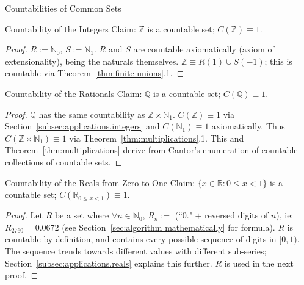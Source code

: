 \documentclass[12pt]{article}
\begin{document}
\begin{section}{Countabilities of Common Sets}\label{sec:applications}
	\begin{subsection}{Countability of the Integers}\label{subsec:applications.integers}
		Claim: $\mathbb Z$ is a countable set; $C(\mathbb Z)\equiv1$.
		\begin{proof}
			$R:=\mathbb N_0$, $S:=\mathbb N_1$. $R$ and $S$ are countable axiomatically
			(axiom of extensionality), being the naturals themselves. $\mathbb Z\equiv
			R(1)\cup S(-1)$; this is countable via Theorem~\ref{thm:finite unions}.1.
		\end{proof}
	\end{subsection}

	\begin{subsection}{Countability of the Rationals}\label{subsec:applications.rationals}
		Claim: $\mathbb Q$ is a countable set; $C(\mathbb Q)\equiv1$.
		\begin{proof}
			$\mathbb Q$ has the same countability as $\mathbb Z\times \mathbb N_1$.
			$C(\mathbb Z)\equiv1$ via Section~\ref{subsec:applications.integers} and
			$C(\mathbb N_1)\equiv1$ axiomatically. Thus $C(\mathbb Z\times \mathbb N_1)\equiv1$
			via Theorem~\ref{thm:multiplications}.1. This and Theorem~\ref{thm:multiplications} derive
			from Cantor's enumeration of countable collections of countable sets.
		\end{proof}
	\end{subsection}

	\pagebreak\begin{subsection}{Countability of the Reals from Zero to One}
	\label{subsec:applications.reals 0 to 1}
		Claim: $\{x\in\mathbb R:0\leqslant x<1\}$ is a countable set;
		$C(\mathbb R_{0\leqslant x<1})\equiv1$.
		\begin{proof}
			Let $R$ be a set where $\forall n\in\mathbb N_0$, $R_n := $ (``0." $+$ reversed digits
			of $n$), ie: $R_{2760}=0.0672$ (see Section~\ref{sec:algorithm mathematically} for formula). $R$
			is countable by definition, and contains every possible sequence of digits in $[0,1)$. The
			sequence trends towards different values with different sub-series;
			Section~\ref{subsec:applications.reals} explains this further. $R$ is used in the next
			proof.
		\end{proof}
	\end{subsection}


\end{section}
\end{document}
